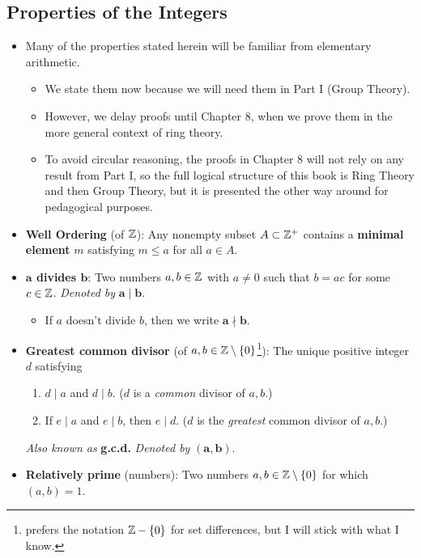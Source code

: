 \documentclass[../notes.tex]{subfiles}
\begin{document}
\subsection*{Properties of the Integers}
\begin{itemize}
    \item Many of the properties stated herein will be familiar from elementary arithmetic.
    \begin{itemize}
        \item We state them now because we will need them in Part I (Group Theory).
        \item However, we delay proofs until Chapter 8, when we prove them in the more general context of ring theory.
        \item To avoid circular reasoning, the proofs in Chapter 8 will not rely on any result from Part I, so the full logical structure of this book is Ring Theory and then Group Theory, but it is presented the other way around for pedagogical purposes.
    \end{itemize}
    \item \textbf{Well Ordering} (of $\mathbb{Z}$): Any nonempty subset $A\subset\mathbb{Z}^+$ contains a \textbf{minimal element} $m$ satisfying $m\leq a$ for all $a\in A$.
    \item \textbf{$\bm{a}$ divides $\bm{b}$}: Two numbers $a,b\in\mathbb{Z}$ with $a\neq 0$ such that $b=ac$ for some $c\in\mathbb{Z}$. \emph{Denoted by} $\bm{a\mid b}$.
    \begin{itemize}
        \item If $a$ doesn't divide $b$, then we write $\bm{a\nmid b}$.
    \end{itemize}
    \item \textbf{Greatest common divisor} (of $a,b\in\mathbb{Z}\setminus\{0\}$\footnote{\textcite{bib:DummitFoote} prefers the notation $\mathbb{Z}-\{0\}$ for set differences, but I will stick with what I know.}): The unique positive integer $d$ satisfying
    \begin{enumerate}
        \item $d\mid a$ and $d\mid b$. ($d$ is a \emph{common} divisor of $a,b$.)
        \item If $e\mid a$ and $e\mid b$, then $e\mid d$. ($d$ is the \emph{greatest} common divisor of $a,b$.)
    \end{enumerate}
    \emph{Also known as} \textbf{g.c.d.} \emph{Denoted by} $\bm{(a,b)}$.
    \item \textbf{Relatively prime} (numbers): Two numbers $a,b\in\mathbb{Z}\setminus\{0\}$ for which $(a,b)=1$.

\end{itemize}
\end{document}
